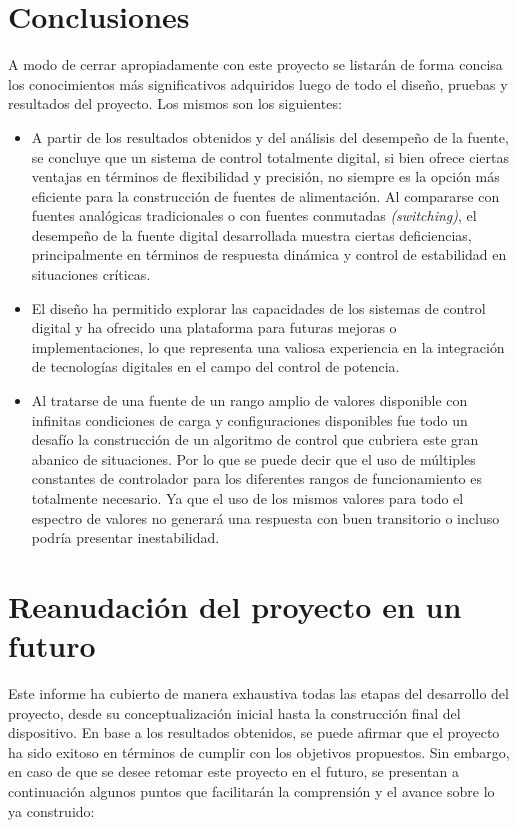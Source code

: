 \section{Conclusiones} 
A modo de cerrar apropiadamente con este proyecto se listarán de forma concisa los conocimientos más significativos adquiridos luego de todo el diseño, pruebas y resultados del proyecto. Los mismos son los siguientes:\par 
\begin{itemize}
    \item A partir de los resultados obtenidos y del análisis del desempeño de la fuente, se concluye que un sistema de control totalmente digital, si bien ofrece ciertas ventajas en términos de flexibilidad y precisión, no siempre es la opción más eficiente para la construcción de fuentes de alimentación. Al compararse con fuentes analógicas tradicionales o con fuentes conmutadas \textit{(switching)}, el desempeño de la fuente digital desarrollada muestra ciertas deficiencias, principalmente en términos de respuesta dinámica y control de estabilidad en situaciones críticas.\par
    \item El diseño ha permitido explorar las capacidades de los sistemas de control digital y ha ofrecido una plataforma para futuras mejoras o implementaciones, lo que representa una valiosa experiencia en la integración de tecnologías digitales en el campo del control de potencia.
    \item Al tratarse de una fuente de un rango amplio de valores disponible con infinitas condiciones de carga y configuraciones disponibles fue todo un desafío la construcción de un algoritmo de control que cubriera este gran abanico de situaciones. Por lo que se puede decir que el uso de múltiples constantes de controlador para los diferentes rangos de funcionamiento es totalmente necesario. Ya que el uso de los mismos valores para todo el espectro de valores no generará una respuesta con buen transitorio o incluso podría presentar inestabilidad.
\end{itemize}

\section{Reanudación del proyecto en un futuro} 
Este informe ha cubierto de manera exhaustiva todas las etapas del desarrollo del proyecto, desde su conceptualización inicial hasta la construcción final del dispositivo. En base a los resultados obtenidos, se puede afirmar que el proyecto ha sido exitoso en términos de cumplir con los objetivos propuestos. Sin embargo, en caso de que se desee retomar este proyecto en el futuro, se presentan a continuación algunos puntos que facilitarán la comprensión y el avance sobre lo ya construido:

